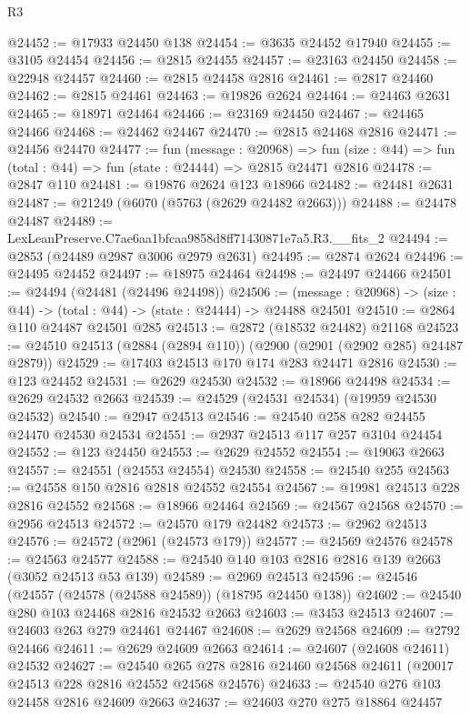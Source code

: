 \begin{lexlean}{R3}
\begin{coremodule}
@24452 := @17933 @24450 @138
@24454 := @3635 @24452 @17940
@24455 := @3105 @24454
@24456 := @2815 @24455
@24457 := @23163 @24450
@24458 := @22948 @24457
@24460 := @2815 @24458 @2816
@24461 := @2817 @24460
@24462 := @2815 @24461
@24463 := @19826 @2624
@24464 := @24463 @2631
@24465 := @18971 @24464
@24466 := @23169 @24450
@24467 := @24465 @24466
@24468 := @24462 @24467
@24470 := @2815 @24468 @2816
@24471 := @24456 @24470
@24477 := fun (message : @20968) =>
  fun (size : @44) => fun (total : @44) => fun (state : @24444) => @2815 @24471 @2816
@24478 := @2847 @110
@24481 := @19876 @2624 @123 @18966
@24482 := @24481 @2631
@24487 := @21249 (@6070 (@5763 (@2629 @24482 @2663)))
@24488 := @24478 @24487
@24489 := LexLeanPreserve.C7ae6aa1bfcaa9858d8ff71430871e7a5.R3.__fits_2
@24494 := @2853 (@24489 @2987 @3006 @2979 @2631)
@24495 := @2874 @2624
@24496 := @24495 @24452
@24497 := @18975 @24464
@24498 := @24497 @24466
@24501 := @24494 (@24481 (@24496 @24498))
@24506 := (message : @20968) -> (size : @44) -> (total : @44) -> (state : @24444) -> @24488 @24501
@24510 := @2864 @110 @24487 @24501 @285
@24513 := @2872 (@18532 @24482) @21168
@24523 := @24510 @24513 (@2884 (@2894 @110)) (@2900 (@2901 (@2902 @285) @24487 @2879))
@24529 := @17403 @24513 @170 @174 @283 @24471 @2816
@24530 := @123 @24452
@24531 := @2629 @24530
@24532 := @18966 @24498
@24534 := @2629 @24532 @2663
@24539 := @24529 (@24531 @24534) (@19959 @24530 @24532)
@24540 := @2947 @24513
@24546 := @24540 @258 @282 @24455 @24470 @24530 @24534
@24551 := @2937 @24513 @117 @257 @3104 @24454
@24552 := @123 @24450
@24553 := @2629 @24552
@24554 := @19063 @2663
@24557 := @24551 (@24553 @24554) @24530
@24558 := @24540 @255
@24563 := @24558 @150 @2816 @2818 @24552 @24554
@24567 := @19981 @24513 @228 @2816 @24552
@24568 := @18966 @24464
@24569 := @24567 @24568
@24570 := @2956 @24513
@24572 := @24570 @179 @24482
@24573 := @2962 @24513
@24576 := @24572 (@2961 (@24573 @179))
@24577 := @24569 @24576
@24578 := @24563 @24577
@24588 := @24540 @140 @103 @2816 @2816 @139 @2663 (@3052 @24513 @53 @139)
@24589 := @2969 @24513
@24596 := @24546 (@24557 (@24578 (@24588 @24589)) (@18795 @24450 @138))
@24602 := @24540 @280 @103 @24468 @2816 @24532 @2663
@24603 := @3453 @24513
@24607 := @24603 @263 @279 @24461 @24467
@24608 := @2629 @24568
@24609 := @2792 @24466
@24611 := @2629 @24609 @2663
@24614 := @24607 (@24608 @24611) @24532
@24627 := @24540
    @265
    @278
    @2816
    @24460
    @24568
    @24611
    (@20017 @24513 @228 @2816 @24552 @24568 @24576)
@24633 := @24540 @276 @103 @24458 @2816 @24609 @2663
@24637 := @24603 @270 @275 @18864 @24457

\end{coremodule}
\end{lexlean}
